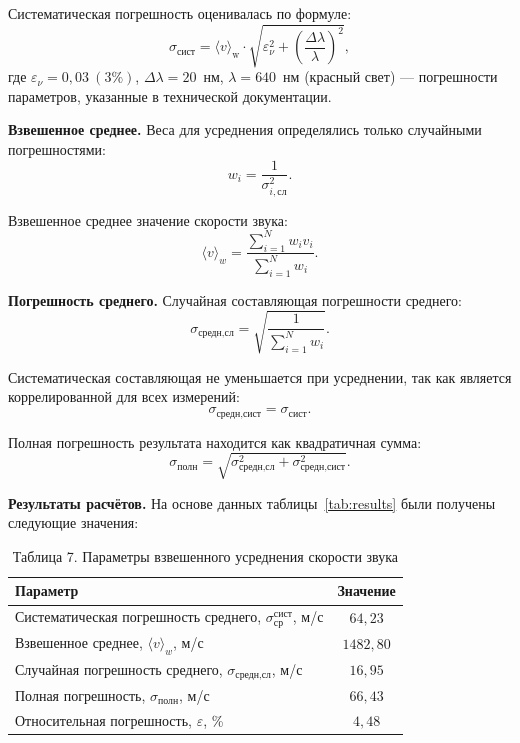 \documentclass[a4paper]{article}
\begin{document}
\begin{enumerate}
Систематическая погрешность оценивалась по формуле:
\begin{equation}
    \sigma_{\text{сист}} = \langle v \rangle_{\text{w}} \cdot 
    \sqrt{  \varepsilon_\nu ^2 + \left( \frac{\Delta \lambda}{\lambda} \right)^2 },
\end{equation}
где $\varepsilon_\nu = 0,03 \ (3\%)$, $\Delta \lambda = 20$~нм, $\lambda = 640$~нм (красный свет) --- погрешности параметров, указанные в технической документации.

\textbf {Взвешенное среднее.} Веса для усреднения определялись только случайными погрешностями:
\begin{equation}
    w_i = \frac{1}{\sigma_{i,\text{сл}}^2}.
\end{equation}

Взвешенное среднее значение скорости звука:
\begin{equation}
    \langle v \rangle_w = \frac{\sum\limits_{i=1}^{N} w_i v_i}{\sum\limits_{i=1}^{N} w_i}.
\end{equation}

\textbf {Погрешность среднего.} Случайная составляющая погрешности среднего:
\begin{equation}
    \sigma_{\text{средн,сл}} = \sqrt{ \frac{1}{\sum\limits_{i=1}^{N} w_i} }.
\end{equation}

Систематическая составляющая не уменьшается при усреднении, так как является коррелированной для всех измерений:
\begin{equation}
    \sigma_{\text{средн,сист}} = \sigma_{\text{сист}}.
\end{equation}

Полная погрешность результата находится как квадратичная сумма:
\begin{equation}
    \sigma_{\text{полн}} = \sqrt{ \sigma_{\text{средн,сл}}^2 + \sigma_{\text{средн,сист}}^2 }.
\end{equation}

\textbf {Результаты расчётов.} На основе данных таблицы~\ref{tab:results} были получены следующие значения:

\begin{table}[h!]
\centering

\begin{tabular}{|l|c|}
\hline
Параметр & Значение \\
\hline
Систематическая погрешность среднего, $\sigma_{\text{ср}}^{\text{сист}}$, м/с & $64{,}23$ \\ \hline
Взвешенное среднее, $\langle v \rangle_w$, м/с & $1482{,}80$ \\ \hline
Случайная погрешность среднего, $\sigma_{\text{средн,сл}}$, м/с & $16{,}95$ \\ \hline
Полная погрешность, $\sigma_{\text{полн}}$, м/с & $66{,}43$ \\ \hline
Относительная погрешность, $\varepsilon$, \% & $4{,}48$ \\ \hline
\end{tabular}
\caption{Таблица 7. Параметры взвешенного усреднения скорости звука}
\label{tab:weighted_avg}
\end{table}


\end{enumerate}
\end{document}
